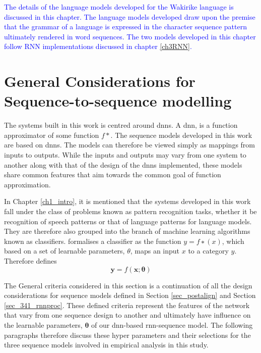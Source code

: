 
\textcolor{blue}{
The details of the language models developed for the Wakirike language is discussed in this chapter.  The language models developed draw  upon the premise that the grammar of a language is expressed in the character sequence pattern ultimately rendered in word sequences.  The two models developed in this chapter follow RNN implementations discussed in chapter \ref{ch3RNN}. }

\startblue
\section{General Considerations for Sequence-to-sequence modelling}\label{sec_c6_seqdesign}
The systems built in this work is centred around \acrfull{dnns}.  A \acrshort{dnn}, is a function approximator of some function $f\ast$. The sequence models developed in this work are based on \acrshort{dnns}.  The models can therefore be viewed simply as mappings from inputs to outputs.  While the inputs and outputs may vary from one system to another along with that of the design of the \acrshort{dnn}s implemented, these models share common features that aim towards the common goal of function approximation.  

In Chapter \ref{ch1_intro}, it is mentioned that the systems developed in this work fall under the class of problems known as pattern recognition tasks, whether it be recognition of speech patterns or that of language patterns for language models.  They are therefore also grouped into the branch of machine learning algorithms known as classifiers.  \cite{Goodfellow-et-al-2016} formalises a classiﬁer as the function $y=f∗(x)$, which based on a set of learnable parameters, $\theta$, maps an input $x$ to a category $y$. Therefore defines
\begin{equation}\mathbf{y}=f(\mathbf{x;\theta})  \end{equation}\label{eq_c6_classifier}

The General criteria considered in this section is a continuation of all the design considerations for sequence models defined in Section \ref{sec_postalign} and Section \ref{sec_341_rnnproc}.  These defined criteria represent the features of the network that vary from one sequence design to another and ultimately have influence on the learnable parameters, $\mathbf{\theta}$ of our \acrshort{dnn}-based \acrshort{rnn}-sequence model. The following paragraphs therefore discuss these hyper parameters and their selections for the three sequence models involved in empirical analysis in this study.

